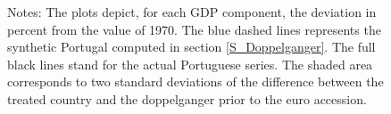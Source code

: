 \documentclass[12pt]{article}
\newcommand{\annote}[1]{\parbox{\textwidth}{\renewcommand{\baselinestretch}{1.0}\vspace{12pt} \small Notes: #1}}
\begin{document}
\begin{appendices}
\begin{figure}[h!]
    \annote{The plots depict, for each GDP component, the deviation in percent from the value of 1970. The blue dashed lines represents the synthetic Portugal computed in section \ref{S_Doppelganger}. The full black lines stand for the actual Portuguese series.  The shaded area corresponds to two standard deviations of the difference between the treated country and the doppelganger prior to the euro accession.}
\end{figure}


\end{appendices}
\end{document}
